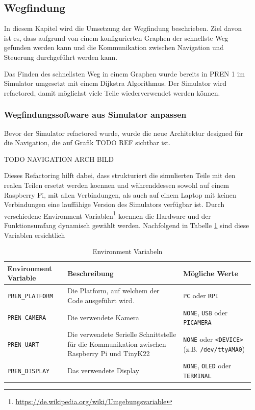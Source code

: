 \subsection{Wegfindung}

In diesem Kapitel wird die Umsetzung der Wegfindung beschrieben. Ziel davon ist es, dass aufgrund von einem konfigurierten Graphen der schnellste Weg gefunden werden kann und die Kommunikation zwischen Navigation und Steuerung durchgeführt werden kann.

Das Finden des schnellsten Weg in einem Graphen wurde bereits in PREN 1 im Simulator umgesetzt mit einem Dijkstra Algorithmus. Der Simulator wird refactored, damit möglichst viele Teile wiederverwendet werden können.

\subsubsection{Wegfindungssoftware aus Simulator anpassen}
\label{navigation-arch}

Bevor der Simulator refactored wurde, wurde die neue Architektur designed für die Navigation, die auf Grafik TODO REF sichtbar ist.

TODO NAVIGATION ARCH BILD

Dieses Refactoring hilft dabei, dass strukturiert die simulierten Teile mit den realen Teilen ersetzt werden koennen und währenddessen sowohl auf einem Raspberry Pi, mit allen Verbindungen, als auch auf einem Laptop mit keinen Verbindungen eine lauffähige Version des Simulators verfügbar ist.
Durch verschiedene Environment Variablen\footnote{\url{https://de.wikipedia.org/wiki/Umgebungsvariable}} koennen die Hardware und der Funktionsumfang dynamisch gewählt werden. Nachfolgend in Tabelle \ref{table:environment-variables} sind diese Variablen ersichtlich


\begin{table}[H]
    \centering
    \begin{tabularx}{\textwidth}{|X|X|X|}
    \hline
        \textbf{Environment Variable} & \textbf{Beschreibung} & \textbf{Mögliche Werte}\\
        \hline
         \verb|PREN_PLATFORM| & Die Platform, auf welchem der Code ausgeführt wird. & \verb|PC| oder \verb|RPI| \\
         \hline
         \verb|PREN_CAMERA| & Die verwendete Kamera & \verb|NONE|, \verb|USB| oder \verb|PICAMERA| \\
         \hline
         \verb|PREN_UART| & Die verwendete Serielle Schnittstelle für die Kommunikation zwischen Raspberry Pi und TinyK22 & \verb|NONE| oder \verb|<DEVICE>| \newline (z.B. \verb|/dev/ttyAMA0|) \\
         \hline
         \verb|PREN_DISPLAY| & Das verwendete Display &  \verb|NONE|, \verb|OLED| oder \verb|TERMINAL|  \\
         \hline
    \end{tabularx}
    \caption{Environment Variabeln}
    \label{table:environment-variables}
\end{table}

